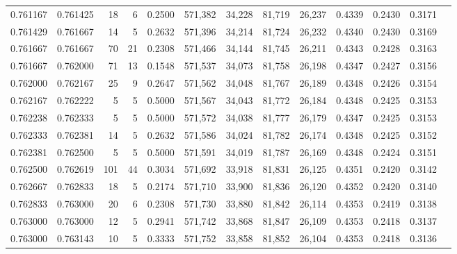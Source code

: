 \begin{tabular}{rrrrrrrrrrrrr}
0.761167 & 0.761425 &    18 &   6 &                                     0.2500 & 571,382 &  34,228 &  81,719 &  26,237 & 0.4339 & 0.2430 & 0.3171 \\
0.761429 & 0.761667 &    14 &   5 &                                     0.2632 & 571,396 &  34,214 &  81,724 &  26,232 & 0.4340 & 0.2430 & 0.3169 \\
0.761667 & 0.761667 &    70 &  21 &                                     0.2308 & 571,466 &  34,144 &  81,745 &  26,211 & 0.4343 & 0.2428 & 0.3163 \\
0.761667 & 0.762000 &    71 &  13 &                                     0.1548 & 571,537 &  34,073 &  81,758 &  26,198 & 0.4347 & 0.2427 & 0.3156 \\
0.762000 & 0.762167 &    25 &   9 &                                     0.2647 & 571,562 &  34,048 &  81,767 &  26,189 & 0.4348 & 0.2426 & 0.3154 \\
0.762167 & 0.762222 &     5 &   5 &                                     0.5000 & 571,567 &  34,043 &  81,772 &  26,184 & 0.4348 & 0.2425 & 0.3153 \\
0.762238 & 0.762333 &     5 &   5 &                                     0.5000 & 571,572 &  34,038 &  81,777 &  26,179 & 0.4347 & 0.2425 & 0.3153 \\
0.762333 & 0.762381 &    14 &   5 &                                     0.2632 & 571,586 &  34,024 &  81,782 &  26,174 & 0.4348 & 0.2425 & 0.3152 \\
0.762381 & 0.762500 &     5 &   5 &                                     0.5000 & 571,591 &  34,019 &  81,787 &  26,169 & 0.4348 & 0.2424 & 0.3151 \\
0.762500 & 0.762619 &   101 &  44 &                                     0.3034 & 571,692 &  33,918 &  81,831 &  26,125 & 0.4351 & 0.2420 & 0.3142 \\
0.762667 & 0.762833 &    18 &   5 &                                     0.2174 & 571,710 &  33,900 &  81,836 &  26,120 & 0.4352 & 0.2420 & 0.3140 \\
0.762833 & 0.763000 &    20 &   6 &                                     0.2308 & 571,730 &  33,880 &  81,842 &  26,114 & 0.4353 & 0.2419 & 0.3138 \\
0.763000 & 0.763000 &    12 &   5 &                                     0.2941 & 571,742 &  33,868 &  81,847 &  26,109 & 0.4353 & 0.2418 & 0.3137 \\
0.763000 & 0.763143 &    10 &   5 &                                     0.3333 & 571,752 &  33,858 &  81,852 &  26,104 & 0.4353 & 0.2418 & 0.3136 \\

\end{tabular}
